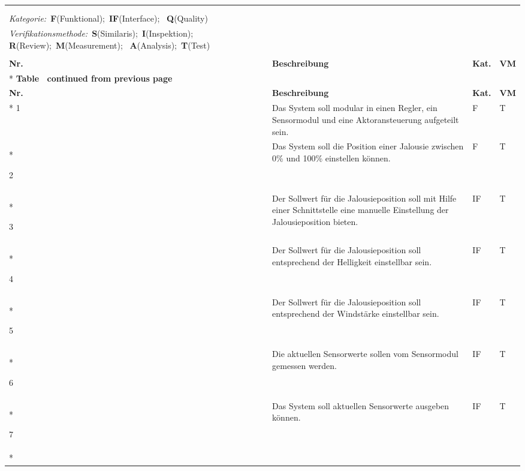 \begin{longtable}[ht]{p{}  p{} p{} p{}}
	\captionabove[Requirements des Systems]{Requirements des Systems}\\
	\label{tab:requirements}\\
	\textit{Kategorie:}~\textbf{F}(Funktional);~\textbf{IF}(Interface);~
	\textbf{Q}(Quality)\\
	\textit{Verifikationsmethode:}~\textbf{S}(Similaris);~\textbf{I}(Inspektion);~
	\textbf{R}(Review);~\textbf{M}(Measurement);~
	\textbf{A}(Analysis);~\textbf{T}(Test)\\ 
	\\
	\toprule
	\rowcolor[HTML]{FFFC9E} 
	{\color[HTML]{333333} \textbf{Nr.}} & {\color[HTML]{333333} \textbf{Beschreibung}}  & {\color[HTML]{333333} \textbf{Kat.}} & {\color[HTML]{333333} \textbf{VM}} \\* \midrule
	\endfirsthead
	\multicolumn{4}{c}%
	{{\bfseries Table \thetable\ continued from previous page}} \\
	\toprule
	\rowcolor[HTML]{FFFC9E} 
	{\color[HTML]{333333} \textbf{Nr.}} & {\color[HTML]{333333} \textbf{Beschreibung}}  & {\color[HTML]{333333} \textbf{Kat.}} & {\color[HTML]{333333} \textbf{VM}} \\* \midrule
	\endhead
	1 & Das System soll modular in einen Regler, ein Sensormodul und eine Aktoransteuerung aufgeteilt sein. & F & T \\* \midrule
	
	2 & Das System soll die Position einer Jalousie zwischen 0\% und 100\% einstellen können. & F & T \\* \midrule
	
	3 & Der Sollwert für die Jalousieposition soll mit Hilfe einer Schnittstelle eine manuelle Einstellung der Jalousieposition bieten. & IF & T \\* \midrule
	
	4 & Der Sollwert für die Jalousieposition soll entsprechend der Helligkeit einstellbar sein. & IF& T \\* \midrule
	
	5 & Der Sollwert für die Jalousieposition soll entsprechend der Windstärke einstellbar sein. & IF& T \\* \midrule
	
	6 & Die aktuellen Sensorwerte sollen vom Sensormodul gemessen werden. & IF& T \\* \midrule
	
	7 & Das System soll aktuellen Sensorwerte ausgeben können. & IF & T \\* \midrule
	

\end{longtable}
